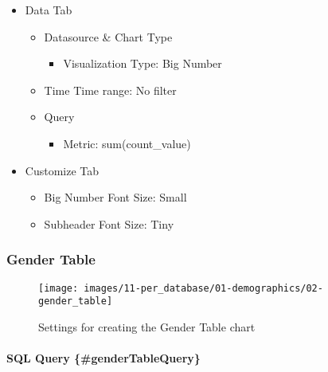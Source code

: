\documentclass[
]{book}
\providecommand{\tightlist}{%
  \setlength{\itemsep}{0pt}\setlength{\parskip}{0pt}}
\begin{document}
\begin{itemize}
\tightlist
\item
  Data Tab

  \begin{itemize}
  \tightlist
  \item
    Datasource \& Chart Type

    \begin{itemize}
    \tightlist
    \item
      Visualization Type: Big Number
    \end{itemize}
  \item
    Time
    Time range: No filter
  \item
    Query

    \begin{itemize}
    \tightlist
    \item
      Metric: sum(count\_value)
    \end{itemize}
  \end{itemize}
\item
  Customize Tab

  \begin{itemize}
  \tightlist
  \item
    Big Number Font Size: Small
  \item
    Subheader Font Size: Tiny
  \end{itemize}
\end{itemize}

\hypertarget{gender-table}{%
\subsubsection*{Gender Table}\label{gender-table}}

\begin{figure}
\texttt{[image: images/11-per\_database/01-demographics/02-gender\_table]} \caption{Settings for creating the Gender Table chart}\label{fig:genderTable}
\end{figure}

\hypertarget{sql-query-gendertablequery}{%
\paragraph*{SQL Query \{\#genderTableQuery\}}\label{sql-query-gendertablequery}}
\end{document}
